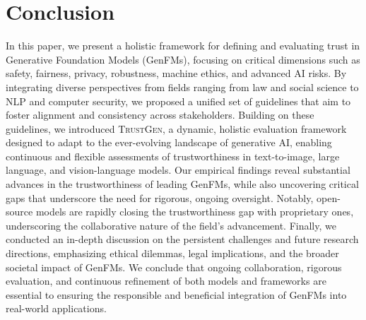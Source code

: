 
\newcommand{\coloredcheckmark}[1]{%
    \tikz[baseline=(checkIcon.base)]{
        \node[
            draw=gray!20,
            line width=0.01pt,
            fill=#1!70!black,
            rounded corners,
            inner sep=1.7pt
        ] (checkIcon) {\textcolor{white}{$\checkmark$}};
    }
}


\newcommand{\leadercheckmark}[1]{%
    \tikz[baseline=(checkIcon.base)]{
        \node[
            draw=gray!20,
            line width=0.01pt,
            fill=#1!70!black,
            rounded corners,
            inner sep=1.7pt
        ] (checkIcon) {\textcolor{white}{$\checkmark^*$}};

    }
}





\section{Conclusion}
In this paper, we present a holistic framework for defining and evaluating trust in Generative Foundation Models (GenFMs), focusing on critical dimensions such as safety, fairness, privacy, robustness, machine ethics, and advanced AI risks. By integrating diverse perspectives from fields ranging from law and social science to NLP and computer security, we proposed a unified set of guidelines that aim to foster alignment and consistency across stakeholders. 
Building on these guidelines, we introduced \textsc{TrustGen}, a dynamic, holistic evaluation framework designed to adapt to the ever-evolving landscape of generative AI, enabling continuous and flexible assessments of trustworthiness in text-to-image, large language, and vision-language models.
Our empirical findings reveal substantial advances in the trustworthiness of leading GenFMs, while also uncovering critical gaps that underscore the need for rigorous, ongoing oversight.
Notably, open-source models are rapidly closing the trustworthiness gap with proprietary ones, underscoring the collaborative nature of the field’s advancement. 
Finally, we conducted an in-depth discussion on the persistent challenges and future research directions, emphasizing ethical dilemmas, legal implications, and the broader societal impact of GenFMs. 
We conclude that ongoing collaboration, rigorous evaluation, and continuous refinement of both models and frameworks are essential to ensuring the responsible and beneficial integration of GenFMs into real-world applications.

